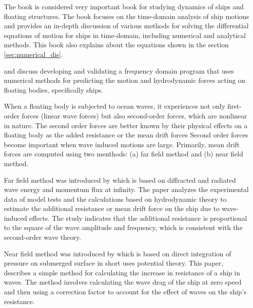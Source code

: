 The book \cite{liapis1986time} is considered very important book for studying dynamics of ships and
floating structures. The book focuses on the time-domain analysis of ship motions and provides 
an in-depth discussion of various methods for solving the differential equations of motion 
for ships in time-domain, including numerical and analytical methods. This book also explains about the
equations shown in the section \ref{sec:numerical_dis}.

\cite{guha2013development} and \cite{guha2015estimation} discuss developing and validating a 
frequency domain program that uses numerical methods for predicting the motion and hydrodynamic 
forces acting on floating bodies, specifically ships.

When a floating body is subjected to ocean waves, it experiences not only first-order forces 
(linear wave forces) but also second-order forces, which are nonlinear in nature. 
The second order forces are better known by their physical effects on a floating
body as the added resistance or the mean drift forces
Second order forces become important when wave induced motions are large. 
Primarily, mean drift forces are computed using two menthods:
(a) far field method and (b) near field method. 

Far field method was introduced by \cite{maruo1957excess} which is based on diffracted and radiated
wave energy and momentum flux at infinity.
The paper analyzes the experimental 
data of model tests and the calculations based on hydrodynamic theory to estimate the additional 
resistance or mean drift force on the ship due to wave-induced effects. The study indicates that the additional 
resistance is proportional to the square of the wave amplitude and frequency, which is 
consistent with the second-order wave theory.

Near field method was introduced by \cite{boese1970einfache} which is based on direct integration of 
pressure on submerged surface in short uses potential theory.
This paper, describes a simple method for calculating the increase in resistance of a ship in waves. 
The method involves calculating the wave drag of the ship at zero speed and then using a 
correction factor to account for the effect of waves on the ship's resistance.

